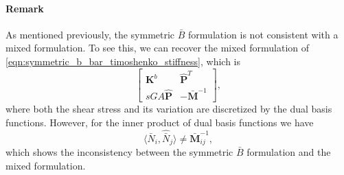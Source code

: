 \paragraph{Remark} { As mentioned previously, the symmetric \Bezier $\bar{B}$ formulation is not consistent with a mixed formulation. To see this, we can recover the mixed formulation of \eqref{eqn:symmetric_b_bar_timoshenko_stiffness}, which is}
\begin{equation}
    \begin{bmatrix}
        \mathbf{K}^b        & \hat{\mathbf{P}}^T     \\
        sGA\hat{\mathbf{P}} & -\bar{\mathbf{M}}^{-1}
    \end{bmatrix},
\end{equation}
{where both the shear stress and its variation are discretized by the dual basis functions. However, for the inner product of dual basis functions we have}
\begin{equation}
    \langle{\hat{\bar{N}}_i,\hat{\bar{N}}_j}\rangle\neq{\bar{\mathbf{M}}^{-1}_{ij}},
\end{equation}
{which shows the inconsistency between the symmetric \Bezier $\bar{B}$ formulation and the mixed formulation.}

